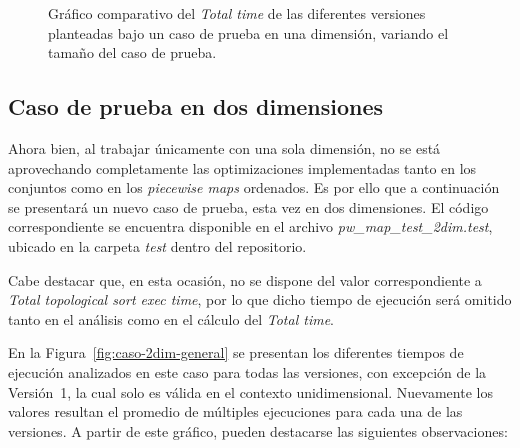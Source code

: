 \begin{figure}[htbp]
  \centering
  \caption{Gráfico comparativo del \textit{Total time} de las diferentes versiones planteadas bajo un caso de prueba en una dimensión, variando el tamaño del caso de prueba.}
  \label{fig:caso-1dim-total2}
\end{figure}


\subsection{Caso de prueba en dos dimensiones}

Ahora bien, al trabajar únicamente con una sola dimensión, no se está aprovechando completamente las optimizaciones implementadas tanto en los conjuntos como en los \textit{piecewise maps} ordenados. Es por ello que a continuación se presentará un nuevo caso de prueba, esta vez en dos dimensiones. El código correspondiente se encuentra disponible en el archivo \textit{pw\_map\_test\_2dim.test}, ubicado en la carpeta \textit{test} dentro del repositorio.

Cabe destacar que, en esta ocasión, no se dispone del valor correspondiente a \textit{Total topological sort exec time}, por lo que dicho tiempo de ejecución será omitido tanto en el análisis como en el cálculo del \textit{Total time}.

En la Figura~\ref{fig:caso-2dim-general} se presentan los diferentes tiempos de ejecución analizados en este caso para todas las versiones, con excepción de la Versión~1, la cual solo es válida en el contexto unidimensional. Nuevamente los valores resultan el promedio de múltiples ejecuciones para cada una de las versiones. A partir de este gráfico, pueden destacarse las siguientes observaciones:

